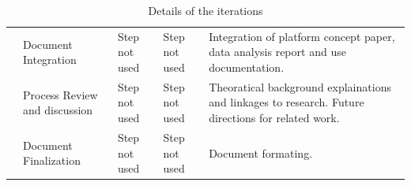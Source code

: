 \begin{table}
\begin{tabular}{|m{2.2cm}|>{\raggedright}m{1.7cm}|>{\raggedright}m{3.4cm}|>{\raggedright}m{3.4cm}|m{3.4cm}|}
	 & Document Integration
 & Step not used  & Step not used  & Integration of  platform concept paper, data analysis report and use documentation.  \\ \cline{2-5}
	 & Process Review and discussion
 & Step not used  & Step not used  & Theoratical background explainations and linkages to research. Future directions for related work. \\ \cline{2-5}
	 & Document Finalization
 & Step not used  & Step not used  & Document formating. \\ \hline
\end{tabular}
\caption{Details of the iterations}
\label{tab:iteration_table}
\end{table}
